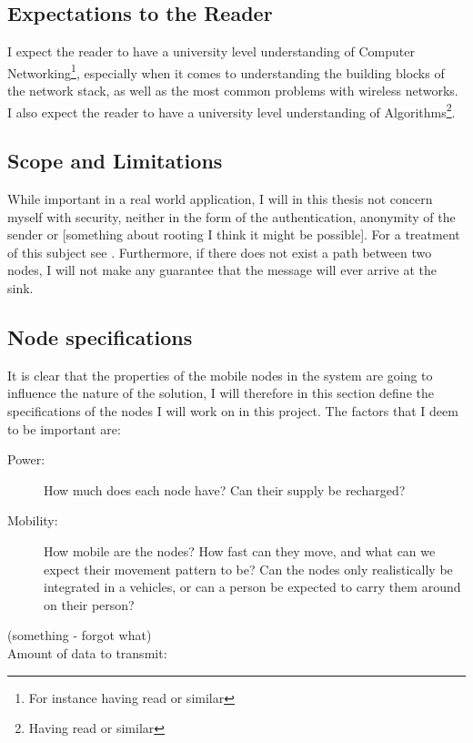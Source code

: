 \subsection{Expectations to the Reader}
I expect the reader to have a university level understanding of Computer Networking\footnote{For instance having read \cite{ComNet} or similar}, especially when it comes to understanding the building blocks of the network stack, as well as the most common problems with wireless networks. I also expect the reader to have a university level understanding of Algorithms\footnote{Having read \cite{algo} or similar}. 

\subsection{Scope and Limitations}
While important in a real world application, I will in this thesis not concern myself with security, neither in the form of the authentication, anonymity of the sender or [something about rooting I think it might be possible]. For a treatment of this subject see \cite{trustedRouting}. Furthermore, if there does not exist a path between two nodes, I will not make any guarantee that the message will ever arrive at the sink. 


\subsection{Node specifications}
It is clear that the properties of the mobile nodes in the system are going to influence the nature of the solution, I will therefore in this section define the specifications of the nodes I will work on in this project. The factors that I deem to be important are: 
\begin{description}
\item[Power:] How much does each node have? Can their supply be recharged?
\item[Mobility:] How mobile are the nodes? How fast can they move, and what can we expect their movement pattern to be? Can the nodes only realistically be integrated in a vehicles, or can a person be expected to carry them around on their person?
\item[(something - forgot what)]
\item[Amount of data to transmit:] 
\end{description}

